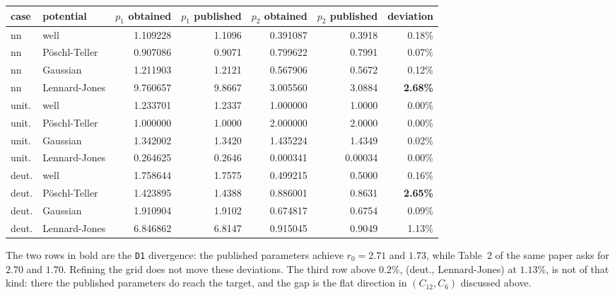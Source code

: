 \documentclass[11pt,a4paper]{article}
\begin{document}
\begin{center}
\footnotesize
\begin{tabular}{llrrrrr}
\toprule
case & potential & $p_1$ obtained & $p_1$ published & $p_2$ obtained & $p_2$ published & deviation \\
\midrule
nn & well          & 1.109228 & 1.1096 & 0.391087 & 0.3918 & 0.18\% \\
nn & Pöschl-Teller & 0.907086 & 0.9071 & 0.799622 & 0.7991 & 0.07\% \\
nn & Gaussian      & 1.211903 & 1.2121 & 0.567906 & 0.5672 & 0.12\% \\
nn & Lennard-Jones & 9.760657 & 9.8667 & 3.005560 & 3.0884 & \textbf{2.68\%} \\
\addlinespace
unit. & well          & 1.233701 & 1.2337 & 1.000000 & 1.0000 & 0.00\% \\
unit. & Pöschl-Teller & 1.000000 & 1.0000 & 2.000000 & 2.0000 & 0.00\% \\
unit. & Gaussian      & 1.342002 & 1.3420 & 1.435224 & 1.4349 & 0.02\% \\
unit. & Lennard-Jones & 0.264625 & 0.2646 & 0.000341 & 0.00034 & 0.00\% \\
\addlinespace
deut. & well          & 1.758644 & 1.7575 & 0.499215 & 0.5000 & 0.16\% \\
deut. & Pöschl-Teller & 1.423895 & 1.4388 & 0.886001 & 0.8631 & \textbf{2.65\%} \\
deut. & Gaussian      & 1.910904 & 1.9102 & 0.674817 & 0.6754 & 0.09\% \\
deut. & Lennard-Jones & 6.846862 & 6.8147 & 0.915045 & 0.9049 & 1.13\% \\
\bottomrule
\end{tabular}
\end{center}
\noindent
The two rows in bold are the \texttt{D1} divergence: the published parameters
achieve $r_0 = 2.71$ and $1.73$, while Table~2 of the same paper asks for $2.70$
and $1.70$. Refining the grid does not move these deviations. The third row
above $0.2\%$, (deut., Lennard-Jones) at $1.13\%$, is not of that kind: there
the published parameters do reach the target, and the gap is the flat direction
in $(C_{12}, C_6)$ discussed above.
\end{document}

